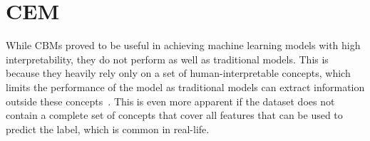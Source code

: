 


\section{CEM}\label{background:cem}

While CBMs proved to be useful in achieving machine learning models with high
interpretability, they do not perform as well as traditional models. 
This is because they heavily rely only on a set of human-interpretable concepts, 
which limits
the performance of the model as traditional models can extract
information outside these concepts~\cite{cbm-hybrid}. 
This is even more apparent
if the dataset does not contain a complete set of concepts that cover all
features that can be used to predict the label, which is common in real-life.

